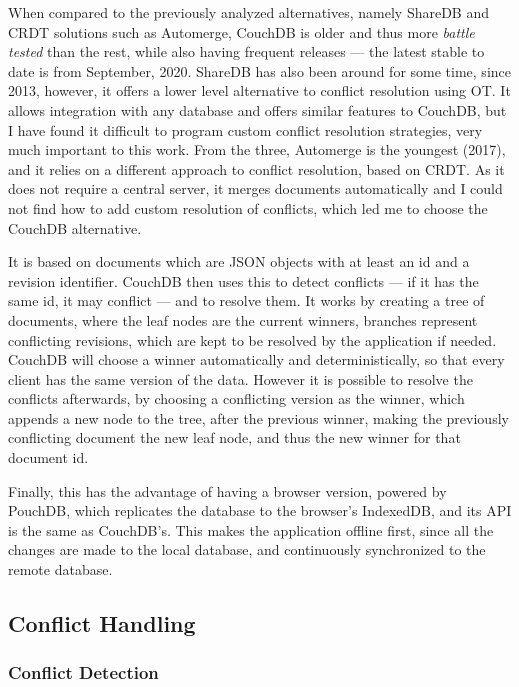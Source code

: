 When compared to the previously analyzed alternatives, namely ShareDB and CRDT solutions such as Automerge, CouchDB is older and thus more \textit{battle tested} than the rest, while also having frequent releases --- the latest stable to date is from September, 2020. ShareDB has also been around for some time, since 2013, however, it offers a lower level alternative to conflict resolution using OT. It allows integration with any database and offers similar features to CouchDB, but I have found it difficult to program custom conflict resolution strategies, very much important to this work. From the three, Automerge is the youngest (2017), and it relies on a different approach to conflict resolution, based on CRDT. As it does not require a central server, it merges documents automatically and I could not find how to add custom resolution of conflicts, which led me to choose the CouchDB alternative.

It is based on documents which are JSON objects with at least an id and a revision identifier. CouchDB then uses this to detect conflicts --- if it has the same id, it may conflict --- and to resolve them. It works by creating a tree of documents, where the leaf nodes are the current winners, branches represent conflicting revisions, which are kept to be resolved by the application if needed. CouchDB will choose a winner automatically and deterministically, so that every client has the same version of the data. However it is possible to resolve the conflicts afterwards, by choosing a conflicting version as the winner, which appends a new node to the tree, after the previous winner, making the previously conflicting document the new leaf node, and thus the new winner for that document id.

Finally, this has the advantage of having a browser version, powered by PouchDB, which replicates the database to the browser's IndexedDB, and its API is the same as CouchDB's. This makes the application offline first, since all the changes are made to the local database, and continuously synchronized to the remote database.

\subsection{Conflict Handling}

\subsubsection{Conflict Detection}

